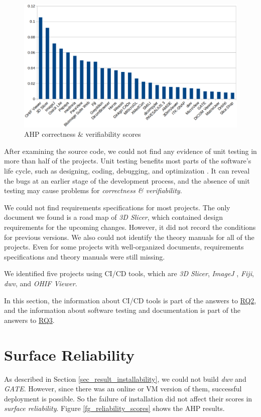 \begin{figure}[H]
\includegraphics[scale=0.38]{figures/correctness_verifiability_scores.png}
\caption{AHP correctness \& verifiability scores}
\label{fg_correctness_erifiability_scores}
\end{figure}

After examining the source code, we could not find any evidence of unit testing in more than half of the projects. Unit testing benefits most parts of the software's life cycle, such as designing, coding, debugging, and optimization \cite{Hamill2004}. It can reveal the bugs at an earlier stage of the development process, and the absence of unit testing may cause problems for \textit{correctness \& verifiability}.

We could not find requirements specifications for most projects. The only document we found is a road map of \textit{3D Slicer}, which contained design requirements for the upcoming changes. However, it did not record the conditions for previous versions. We also could not identify the theory manuals for all of the projects. Even for some projects with well-organized documents, requirements specifications and theory manuals were still missing.

We identified five projects using CI/CD tools, which are \textit{3D Slicer}, \textit{ImageJ
}, \textit{Fiji}, \textit{dwv}, and \textit{OHIF Viewer}.

In this section, the information about CI/CD tools is part of the answers to \hyperlink{rq2}{RQ2}, and the information about software testing and documentation is part of the answers to \hyperlink{rq3}{RQ3}.

\section{Surface Reliability}
\label{sec_result_reliability}
As described in Section \ref{sec_result_installability}, we could not build \textit{dwv} and \textit{GATE}. However, since there was an online or VM version of them, successful deployment is possible. So the failure of installation did not affect their scores in \textit{surface reliability}. Figure \ref{fg_reliability_scores} shows the AHP results.

